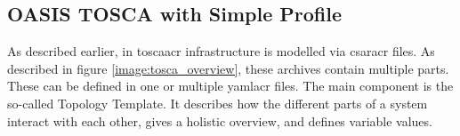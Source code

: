 
\subsection{OASIS TOSCA with Simple Profile}
As described earlier, in \gls{toscaacr} infrastructure is modelled via \gls{csaracr} files. As described in figure \ref{image:tosca_overview}, these archives contain multiple parts. These can be defined in one or multiple \gls{yamlacr} files. The main component is the so-called Topology Template. It describes how the different parts of a system interact with each other, gives a holistic overview, and defines variable values.


